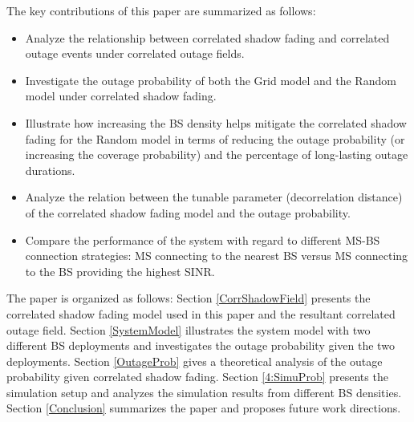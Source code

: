 \documentclass[journal,10pt]{IEEEtran}
\begin{document}
 \par The key contributions of this paper are summarized as follows:
 \begin{itemize}
 \item Analyze the relationship between correlated shadow fading and correlated outage events under correlated outage fields.
 \item Investigate the outage probability of both the Grid model and the Random model under correlated shadow fading.
 \item Illustrate how increasing the BS density helps mitigate the correlated shadow fading for the Random model in terms of reducing the outage probability (or increasing the coverage probability) and the percentage of long-lasting outage durations.
 \item Analyze the relation between the tunable parameter (decorrelation distance) of the correlated shadow fading model and the outage probability.
 \item Compare the performance of the system with regard to different MS-BS connection strategies: MS connecting to the nearest BS versus MS connecting to the BS providing the highest SINR.
 \end{itemize}
 The paper is organized as follows: Section \ref{CorrShadowField} presents the correlated shadow fading model used in this paper and the resultant correlated outage field. Section \ref{SystemModel} illustrates the system model with two different BS deployments and investigates the outage probability given the two deployments. Section \ref{OutageProb} gives a theoretical analysis of the outage probability given correlated shadow fading. Section \ref{4:SimuProb} presents the simulation setup and analyzes the simulation results from different BS densities. Section \ref{Conclusion} summarizes the paper and proposes future work directions.
\end{document}
